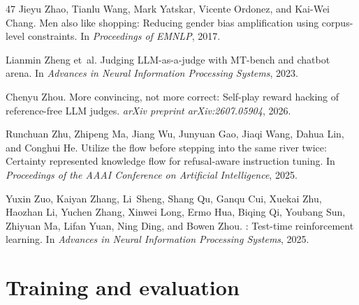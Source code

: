 \documentclass[11pt,a4paper,twocolumn]{article}
\begin{document}
\begin{thebibliography}{47}
Jieyu Zhao, Tianlu Wang, Mark Yatskar, Vicente Ordonez, and Kai-Wei Chang.
\newblock Men also like shopping: Reducing gender bias amplification using
  corpus-level constraints.
\newblock In \emph{Proceedings of EMNLP}, 2017.

Lianmin Zheng et~al.
\newblock Judging {LLM}-as-a-judge with {MT}-bench and chatbot arena.
\newblock In \emph{Advances in Neural Information Processing Systems}, 2023.

Chenyu Zhou.
\newblock More convincing, not more correct: Self-play reward hacking of
  reference-free {LLM} judges.
\newblock \emph{arXiv preprint arXiv:2607.05904}, 2026.

Runchuan Zhu, Zhipeng Ma, Jiang Wu, Junyuan Gao, Jiaqi Wang, Dahua Lin, and
  Conghui He.
\newblock Utilize the flow before stepping into the same river twice: Certainty
  represented knowledge flow for refusal-aware instruction tuning.
\newblock In \emph{Proceedings of the AAAI Conference on Artificial
  Intelligence}, 2025.

Yuxin Zuo, Kaiyan Zhang, Li~Sheng, Shang Qu, Ganqu Cui, Xuekai Zhu, Haozhan Li,
  Yuchen Zhang, Xinwei Long, Ermo Hua, Biqing Qi, Youbang Sun, Zhiyuan Ma,
  Lifan Yuan, Ning Ding, and Bowen Zhou.
: Test-time reinforcement learning.
\newblock In \emph{Advances in Neural Information Processing Systems}, 2025.

\end{thebibliography}

\clearpage
\appendix
\section{Training and evaluation}
\label{app:train}
\end{document}
